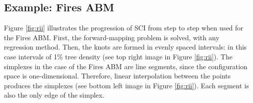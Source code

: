 \subsection{Example: Fires ABM}

Figure \ref{fig:rii} illustrates the progression of SCI from step to step when used for the Fires ABM.
First, the forward-mapping problem is solved, with any regression method.
Then, the knots are formed in evenly spaced intervals: in this case intervals of 1\% tree density (see top right image in Figure \ref{fig:rii}).
The simplexes in the case of the Fires ABM are line segments, since the configuration space is one-dimensional.
Therefore, linear interpolation between the points produces the simplexes (see bottom left image in Figure \ref{fig:rii}).
Each segment is also the only edge of the simplex.

